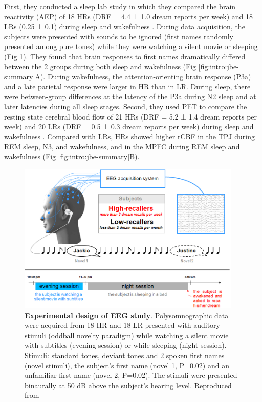 First, they conducted a sleep lab study in which they compared the brain reactivity (AEP) of 18 HRs (DRF = 4.4 ± 1.0 dream reports per week) and 18 LRs (0.25 ± 0.1) during sleep and wakefulness \citep{ruby_alpha_2013, eichenlaub_brain_2014}. During data acquisition, the subjects were presented with sounds to be ignored (first names randomly presented among pure tones) while they were watching a silent movie or sleeping (Fig \ref{fig:intro:jbe-paradigm}). They found that brain responses to first names dramatically differed between the 2 groups during both sleep and wakefulness (Fig \ref{fig:intro:jbe-summary}A). During wakefulness, the attention-orienting brain response (P3a) and a late parietal response were larger in HR than in LR. During sleep, there were between-group differences at the latency of the P3a during N2 sleep and at later latencies during all sleep stages. Second, they used PET to compare the resting state cerebral blood flow of 21 HRs (DRF = 5.2 ± 1.4 dream reports per week) and 20 LRs (DRF = 0.5 ± 0.3 dream reports per week) during sleep and wakefulness \citep{eichenlaub_resting_2014}. Compared with LRs, HRs showed higher rCBF in the TPJ during REM sleep, N3, and wakefulness, and in the MPFC during REM sleep and wakefulness (Fig \ref{fig:intro:jbe-summary}B).

\begin{figure}[!htb]
	\centering
	\includegraphics[width=0.95\textwidth]{Fig/Intro/Intro_JBE_Paradigm/Intro_JBE_Paradigm.png}
	\caption[Experimental design of Eichenlaub et al. (2014) EEG study]{\textbf{Experimental design of \citet{eichenlaub_brain_2014} EEG study}. Polysomnographic data were acquired from 18 HR and 18 LR presented with auditory stimuli (oddball novelty paradigm) while watching a silent movie with subtitles (evening session) or while sleeping (night session). Stimuli: standard tones, deviant tones and 2 spoken first names (novel stimuli), the subject’s first name (novel 1, P=0.02) and an unfamiliar first name (novel 2, P=0.02). The stimuli were presented binaurally at 50 dB above the subject’s hearing level. Reproduced from \citet{eichenlaub_brain_2014}}
	\label{fig:intro:jbe-paradigm}
\end{figure}

